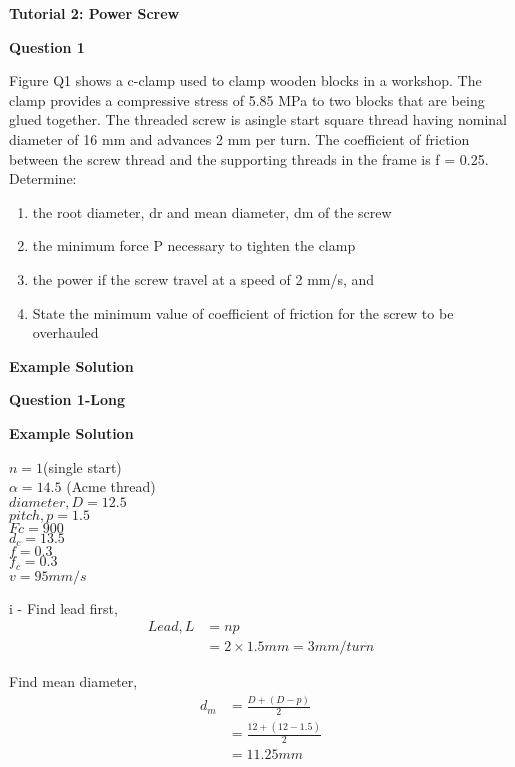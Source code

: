 \documentclass[a4paper, fleqn]{article}
\begin{document}
\textbf{Tutorial 2: Power Screw}
\vspace{10pt}

\textbf{Question 1}

Figure Q1 shows a c-clamp used to clamp wooden blocks in a workshop. The clamp provides a compressive stress of 5.85 MPa to two blocks that are being glued together. The threaded screw is asingle start square thread having nominal diameter of 16 mm and advances 2 mm per turn. The coefficient of friction between the screw thread and the supporting threads in the frame is f = 0.25.
Determine:
\begin{enumerate}[label=(\roman*)]
    \item the root diameter, dr and mean diameter, dm of the screw
    \item the minimum force P necessary to tighten the clamp
    \item the power if the screw travel at a speed of 2 mm/s, and
    \item State the minimum value of coefficient of friction for the screw to be overhauled
\end{enumerate}

\textbf{Example Solution}
\vspace{10pt}



\textbf{Question 1-Long}


\textbf{Example Solution}
\vspace{10pt}

$n = 1$(single start)\\
$\alpha = 14.5$ (Acme thread)\\
$diameter,D = 12.5$\\
$pitch,p = 1.5$\\
$Fc = 900$\\
$d_c = 13.5$\\
$f = 0.3$\\
$f_c = 0.3$\\
$v=95mm/s$
\vspace{10pt}


i - Find lead first,
\begin{equation*}
    \begin{aligned}
    Lead, L &=np\\
    &=2\times1.5mm = 3mm/turn    
    \end{aligned}
\end{equation*}

Find mean diameter,
\begin{equation*}
    \begin{aligned}
    d_m &= \frac {D+(D-p)}{2}\\  
    &= \frac {12+(12-1.5)}{2}\\ 
    &= 11.25mm
    \end{aligned}
\end{equation*}
\end{document}
